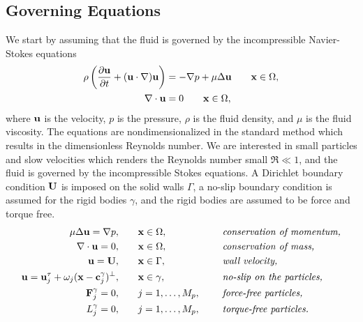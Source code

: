 \documentclass[preprint, 10pt]{elsarticle}
\begin{document}
\subsection{Governing Equations}\label{sec:governing}
We start by assuming that the fluid is governed by the incompressible
Navier-Stokes equations 
\begin{align*}
  \rho\left(\frac{\partial {\mathbf{u}}}{\partial t} + ({\mathbf{u}} \cdot {\nabla}) {\mathbf{u}} \right) &= 
    -{\nabla} p + \mu \Delta {\mathbf{u}} \qquad {\mathbf{x}}\in\Omega,\\
    {\nabla} \cdot {\mathbf{u}} &= 0 \qquad {\mathbf{x}}\in\Omega,
\end{align*}
where ${\mathbf{u}}$ is the velocity, $p$ is the pressure, $\rho$ is the fluid
density, and $\mu$ is the fluid viscosity.  The equations are
nondimensionalized in the standard method which results in the
dimensionless Reynolds number.  We are interested in small particles and
slow velocities which renders the Reynolds number small $\Re \ll 1$, and
the fluid is governed by the incompressible Stokes equations.  A
Dirichlet boundary condition ${\mathbf{U}}$ is imposed on the solid walls
$\Gamma$, a no-slip boundary condition is assumed for the rigid bodies
$\gamma$, and the rigid bodies are assumed to be force and torque free.
\begin{equation}
  \label{eqn:modelEquations}
  \begin{split}
  \mu \Delta {\mathbf{u}} = {\nabla} p, &\hspace{20pt} {\mathbf{x}} \in \Omega, \hspace*{.2in}
    &&\mbox{\em conservation of momentum,}\\
  {\nabla} \cdot {\mathbf{u}} = 0, &\hspace{20pt} {\mathbf{x}} \in \Omega, \hspace*{.2in}
    &&\mbox{\em conservation of mass,} \\
  {\mathbf{u}} = {\mathbf{U}}, &\hspace{20pt} {\mathbf{x}} \in \Gamma, \hspace*{.2in} 
    &&\mbox{\em wall velocity,} \\
  {\mathbf{u}} = {\mathbf{u}}^\tau_j + \omega_j({\mathbf{x}}-{\mathbf{c}}^\gamma_j)^\perp,&\hspace{20pt} 
    {\mathbf{x}} \in \gamma, \hspace*{.2in} &&\mbox{\em no-slip on the particles,} \\
  {\mathbf{F}}_j^\gamma = 0, &\hspace{20pt}j=1,\ldots,M_p, \hspace*{.2in} 
    &&\mbox{\em force-free particles,} \\
  L_j^\gamma = 0, &\hspace{20pt}j=1,\ldots,M_p, \hspace*{.2in} 
    &&\mbox{\em torque-free particles.}
  \end{split}
\end{equation}
\end{document}
